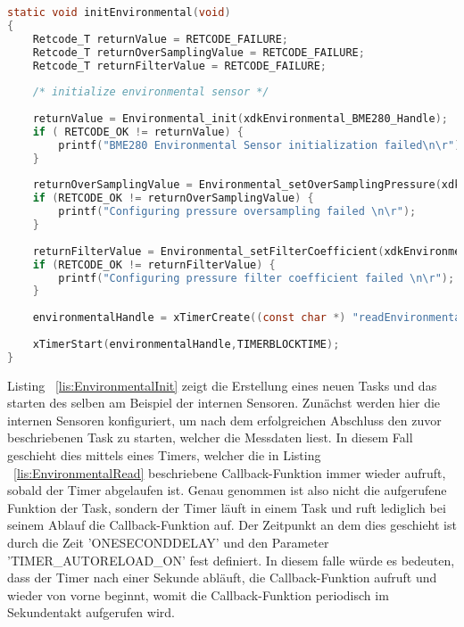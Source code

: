 \begin{lstlisting}[language=C, caption={Task-Initialisierung: Interne Sensoren}, label=lis:EnvironmentalInit]
static void initEnvironmental(void)
{
	Retcode_T returnValue = RETCODE_FAILURE;
	Retcode_T returnOverSamplingValue = RETCODE_FAILURE;
	Retcode_T returnFilterValue = RETCODE_FAILURE;
	
	/* initialize environmental sensor */
	
	returnValue = Environmental_init(xdkEnvironmental_BME280_Handle);
	if ( RETCODE_OK != returnValue) {
		printf("BME280 Environmental Sensor initialization failed\n\r");
	}
	
	returnOverSamplingValue = Environmental_setOverSamplingPressure(xdkEnvironmental_BME280_Handle,ENVIRONMENTAL_BME280_OVERSAMP_2X);
	if (RETCODE_OK != returnOverSamplingValue) {
		printf("Configuring pressure oversampling failed \n\r");
	}
	
	returnFilterValue = Environmental_setFilterCoefficient(xdkEnvironmental_BME280_Handle,ENVIRONMENTAL_BME280_FILTER_COEFF_2);
	if (RETCODE_OK != returnFilterValue) {
		printf("Configuring pressure filter coefficient failed \n\r");
	}
	
	environmentalHandle = xTimerCreate((const char *) "readEnvironmental", ONESECONDDELAY,TIMER_AUTORELOAD_ON, NULL, readEnvironmental);
	
	xTimerStart(environmentalHandle,TIMERBLOCKTIME);
}
\end{lstlisting}
Listing ~\ref{lis:EnvironmentalInit} zeigt die Erstellung eines neuen Tasks und das starten des selben am Beispiel der internen Sensoren. Zunächst werden hier die internen Sensoren konfiguriert, um nach dem erfolgreichen Abschluss den zuvor beschriebenen Task zu starten, welcher die Messdaten liest. \newline 
In diesem Fall geschieht dies mittels eines Timers, welcher die in Listing ~\ref{lis:EnvironmentalRead} beschriebene Callback-Funktion immer wieder aufruft, sobald der Timer abgelaufen ist. Genau genommen ist also nicht die aufgerufene Funktion der Task, sondern der Timer läuft in einem Task und ruft lediglich bei seinem Ablauf die Callback-Funktion auf. \newline
Der Zeitpunkt an dem dies geschieht ist durch die Zeit 'ONESECONDDELAY' und den Parameter 'TIMER\_AUTORELOAD\_ON' fest definiert. In diesem falle würde es bedeuten, dass der Timer nach einer Sekunde abläuft, die Callback-Funktion aufruft und wieder von vorne beginnt, womit die Callback-Funktion periodisch im Sekundentakt aufgerufen wird.


